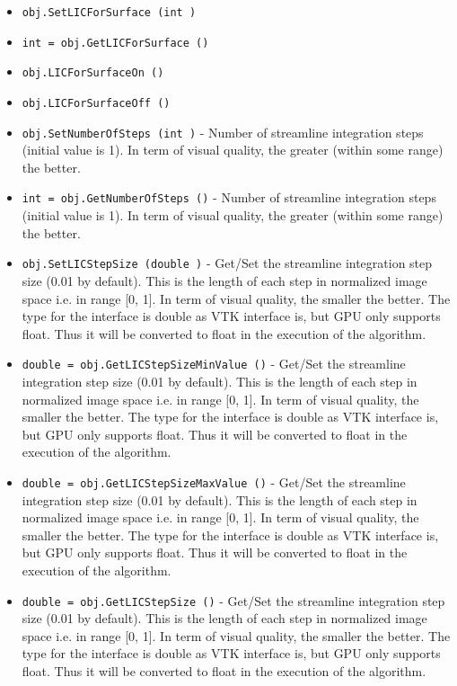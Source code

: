 \begin{itemize}
\item  \verb|obj.SetLICForSurface (int )|

\item  \verb|int = obj.GetLICForSurface ()|

\item  \verb|obj.LICForSurfaceOn ()|

\item  \verb|obj.LICForSurfaceOff ()|

\item  \verb|obj.SetNumberOfSteps (int )| -  Number of streamline integration steps (initial value is 1).
 In term of visual quality, the greater (within some range) the better.

\item  \verb|int = obj.GetNumberOfSteps ()| -  Number of streamline integration steps (initial value is 1).
 In term of visual quality, the greater (within some range) the better.

\item  \verb|obj.SetLICStepSize (double )| -  Get/Set the streamline integration step size (0.01 by default). This is 
 the length of each step in normalized image space i.e. in range [0, 1].
 In term of visual quality, the smaller the better. The type for the 
 interface is double as VTK interface is, but GPU only supports float.
 Thus it will be converted to float in the execution of the algorithm.

\item  \verb|double = obj.GetLICStepSizeMinValue ()| -  Get/Set the streamline integration step size (0.01 by default). This is 
 the length of each step in normalized image space i.e. in range [0, 1].
 In term of visual quality, the smaller the better. The type for the 
 interface is double as VTK interface is, but GPU only supports float.
 Thus it will be converted to float in the execution of the algorithm.

\item  \verb|double = obj.GetLICStepSizeMaxValue ()| -  Get/Set the streamline integration step size (0.01 by default). This is 
 the length of each step in normalized image space i.e. in range [0, 1].
 In term of visual quality, the smaller the better. The type for the 
 interface is double as VTK interface is, but GPU only supports float.
 Thus it will be converted to float in the execution of the algorithm.

\item  \verb|double = obj.GetLICStepSize ()| -  Get/Set the streamline integration step size (0.01 by default). This is 
 the length of each step in normalized image space i.e. in range [0, 1].
 In term of visual quality, the smaller the better. The type for the 
 interface is double as VTK interface is, but GPU only supports float.
 Thus it will be converted to float in the execution of the algorithm.


\end{itemize}
